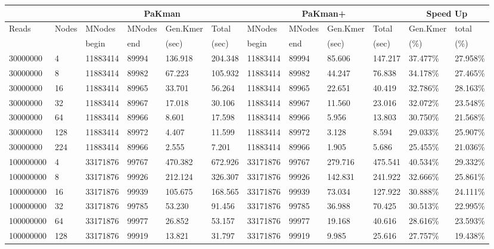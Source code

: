 \begin{tabular}{|l|l|l|l|l|l|l|l|l|l|l|l| }
\hline
\multicolumn{2}{|c|}{} & \multicolumn{4}{|c|}{{\sf PaKman} } & \multicolumn{4}{|c|}{{\sf PaKman+} } & \multicolumn{2}{|c|}{Speed Up} \\ 
\hline 
Reads & Nodes & MNodes & MNodes& Gen.Kmer & Total& MNodes & MNodes & Gen.Kmer & Total & Gen.Kmer & total \\\hline
 & & begin& end & (sec) & (sec) & begin & end & (sec) & (sec) & (\%) & (\%) \\\hline
30000000 &  4 & 11883414 & 89994 & 136.918& 204.348& 11883414 & 89994 & 85.606& 147.217 & 37.477\% & 27.958\% \\ \hline 
30000000 &  8 & 11883414 & 89982 & 67.223& 105.932& 11883414 & 89982 & 44.247& 76.838 & 34.178\% & 27.465\% \\ \hline 
30000000 &  16 & 11883414 & 89965 & 33.701& 56.264& 11883414 & 89965 & 22.651& 40.419 & 32.786\% & 28.163\% \\ \hline 
30000000 &  32 & 11883414 & 89967 & 17.018& 30.106& 11883414 & 89967 & 11.560& 23.016 & 32.072\% & 23.548\% \\ \hline 
30000000 &  64 & 11883414 & 89966 & 8.601& 17.598& 11883414 & 89966 & 5.956& 13.803 & 30.750\% & 21.568\% \\ \hline 
30000000 &  128 & 11883414 & 89972 & 4.407& 11.599& 11883414 & 89972 & 3.128& 8.594 & 29.033\% & 25.907\% \\ \hline 
30000000 &  224 & 11883414 & 89966 & 2.555& 7.201& 11883414 & 89966 & 1.905& 5.686 & 25.455\% & 21.036\% \\ \hline 
100000000 &  4 & 33171876 & 99767 & 470.382& 672.926& 33171876 & 99767 & 279.716& 475.541 & 40.534\% & 29.332\% \\ \hline 
100000000 &  8 & 33171876 & 99926 & 212.124& 326.307& 33171876 & 99926 & 142.831& 241.922 & 32.666\% & 25.861\% \\ \hline 
100000000 &  16 & 33171876 & 99939 & 105.675& 168.565& 33171876 & 99939 & 73.034& 127.922 & 30.888\% & 24.111\% \\ \hline 
100000000 &  32 & 33171876 & 99785 & 53.230& 91.456& 33171876 & 99785 & 36.988& 70.425 & 30.513\% & 22.995\% \\ \hline 
100000000 &  64 & 33171876 & 99977 & 26.852& 53.157& 33171876 & 99977 & 19.168& 40.616 & 28.616\% & 23.593\% \\ \hline 
100000000 &  128 & 33171876 & 99919 & 13.821& 31.797& 33171876 & 99919 & 9.985& 25.616 & 27.757\% & 19.438\% \\ \hline 

\end{tabular}
